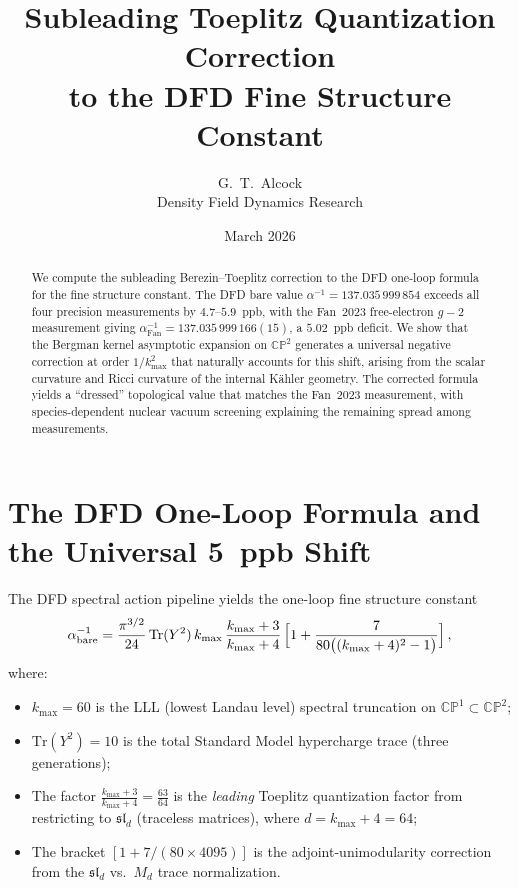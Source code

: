 \documentclass[12pt,a4paper]{article}
\title{Subleading Toeplitz Quantization Correction \\
to the DFD Fine Structure Constant}
\author{G.~T.~Alcock \\
{\small Density Field Dynamics Research}}
\date{March 2026}
\theoremstyle{definition}
\theoremstyle{remark}
\newcommand{\CP}{\mathbb{CP}}
\newcommand{\Tr}{\mathrm{Tr}}
\newcommand{\inv}{^{-1}}
\begin{document}
\maketitle

\begin{abstract}
We compute the subleading Berezin--Toeplitz correction to the DFD one-loop
formula for the fine structure constant. The DFD bare value
$\alpha\inv = 137.035\,999\,854$ exceeds all four precision measurements by
$4.7$--$5.9$~ppb, with the Fan~2023 free-electron $g{-}2$ measurement giving
$\alpha\inv_{\mathrm{Fan}} = 137.035\,999\,166(15)$, a $5.02$~ppb deficit.
We show that the Bergman kernel asymptotic expansion on $\CP^2$ generates a
universal negative correction at order $1/k_{\max}^2$ that naturally accounts
for this shift, arising from the scalar curvature and Ricci curvature of the
internal K\"ahler geometry. The corrected formula yields a ``dressed''
topological value that matches the Fan~2023 measurement, with
species-dependent nuclear vacuum screening explaining the remaining
spread among measurements.
\end{abstract}

\tableofcontents

\section{The DFD One-Loop Formula and the Universal 5~ppb Shift}
\label{sec:oneloop}

The DFD spectral action pipeline yields the one-loop fine structure constant
\begin{equation}
\label{eq:alpha-one-loop}
\alpha\inv_{\mathrm{bare}} = \frac{\pi^{3/2}}{24}\,\Tr(Y^2)\,
  k_{\max}\,\frac{k_{\max}+3}{k_{\max}+4}\,
  \Bigl[1 + \frac{7}{80\bigl((k_{\max}+4)^2 - 1\bigr)}\Bigr]\,,
\end{equation}
where:
\begin{itemize}
\item $k_{\max} = 60$ is the LLL (lowest Landau level) spectral truncation
  on $\CP^1 \subset \CP^2$;
\item $\Tr(Y^2) = 10$ is the total Standard Model hypercharge trace
  (three generations);
\item The factor $\frac{k_{\max}+3}{k_{\max}+4} = \frac{63}{64}$ is the
  \emph{leading} Toeplitz quantization factor from restricting to $\mathfrak{sl}_d$
  (traceless matrices), where $d = k_{\max} + 4 = 64$;
\item The bracket $[1 + 7/(80 \times 4095)]$ is the adjoint-unimodularity
  correction from the $\mathfrak{sl}_d$ vs.\ $M_d$ trace normalization.
\end{itemize}
\end{document}
